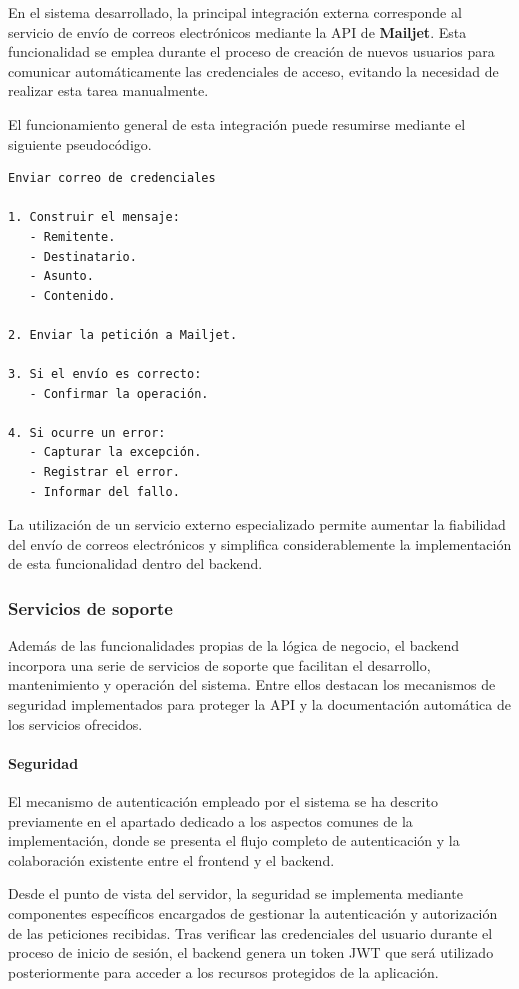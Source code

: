 En el sistema desarrollado, la principal integración externa corresponde al servicio de envío de correos electrónicos mediante la API de \textbf{Mailjet}. Esta funcionalidad se emplea durante el proceso de creación de nuevos usuarios para comunicar automáticamente las credenciales de acceso, evitando la necesidad de realizar esta tarea manualmente.

El funcionamiento general de esta integración puede resumirse mediante el siguiente pseudocódigo.

\begin{Verbatim}[frame=single, fontsize=\small]
Enviar correo de credenciales

1. Construir el mensaje:
   - Remitente.
   - Destinatario.
   - Asunto.
   - Contenido.

2. Enviar la petición a Mailjet.

3. Si el envío es correcto:
   - Confirmar la operación.

4. Si ocurre un error:
   - Capturar la excepción.
   - Registrar el error.
   - Informar del fallo.
\end{Verbatim}

La utilización de un servicio externo especializado permite aumentar la fiabilidad del envío de correos electrónicos y simplifica considerablemente la implementación de esta funcionalidad dentro del backend.

\subsubsection{Servicios de soporte}

Además de las funcionalidades propias de la lógica de negocio, el backend incorpora una serie de servicios de soporte que facilitan el desarrollo, mantenimiento y operación del sistema. Entre ellos destacan los mecanismos de seguridad implementados para proteger la API y la documentación automática de los servicios ofrecidos.

\paragraph{Seguridad}

El mecanismo de autenticación empleado por el sistema se ha descrito previamente en el apartado dedicado a los aspectos comunes de la implementación, donde se presenta el flujo completo de autenticación y la colaboración existente entre el frontend y el backend.

Desde el punto de vista del servidor, la seguridad se implementa mediante componentes específicos encargados de gestionar la autenticación y autorización de las peticiones recibidas. Tras verificar las credenciales del usuario durante el proceso de inicio de sesión, el backend genera un token JWT que será utilizado posteriormente para acceder a los recursos protegidos de la aplicación.

